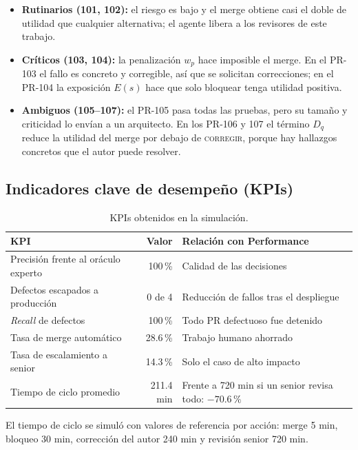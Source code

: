 \documentclass[11pt,a4paper]{article}
\begin{document}
\begin{itemize}[leftmargin=*]
\item \textbf{Rutinarios (101, 102):} el riesgo es bajo y el merge obtiene casi el doble de utilidad
      que cualquier alternativa; el agente libera a los revisores de este trabajo.
\item \textbf{Críticos (103, 104):} la penalización $w_p$ hace imposible el merge. En el PR-103 el
      fallo es concreto y corregible, así que se solicitan correcciones; en el PR-104 la exposición
      $E(s)$ hace que solo bloquear tenga utilidad positiva.
\item \textbf{Ambiguos (105--107):} el PR-105 pasa todas las pruebas, pero su tamaño y criticidad lo
      envían a un arquitecto. En los PR-106 y 107 el término $D_q$ reduce la utilidad del merge por
      debajo de \textsc{corregir}, porque hay hallazgos concretos que el autor puede resolver.
\end{itemize}

\subsection{Indicadores clave de desempeño (KPIs)}

\begin{table}[H]
\centering
\caption{KPIs obtenidos en la simulación.}
\label{tab:kpis}
\begin{tabularx}{\textwidth}{@{}l r X@{}}
\toprule
\textbf{KPI} & \textbf{Valor} & \textbf{Relación con Performance} \\
\midrule
Precisión frente al oráculo experto & 100\,\% & Calidad de las decisiones \\
Defectos escapados a producción & 0 de 4 & Reducción de fallos tras el despliegue \\
\textit{Recall} de defectos & 100\,\% & Todo PR defectuoso fue detenido \\
Tasa de merge automático & 28.6\,\% & Trabajo humano ahorrado \\
Tasa de escalamiento a senior & 14.3\,\% & Solo el caso de alto impacto \\
Tiempo de ciclo promedio & 211.4 min & Frente a 720 min si un senior revisa todo: $-70.6\,\%$ \\
\bottomrule
\end{tabularx}
\end{table}

\noindent El tiempo de ciclo se simuló con valores de referencia por acción: merge 5 min, bloqueo
30 min, corrección del autor 240 min y revisión senior 720 min.
\end{document}
